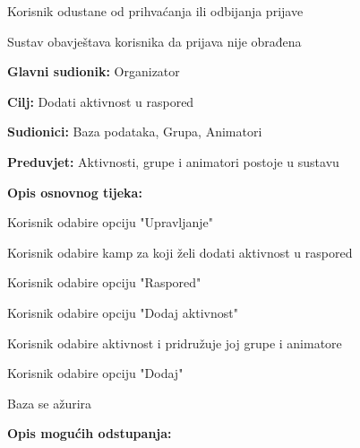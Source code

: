 \begin{packed_item}
\begin{packed_item}
\begin{packed_item}
							\item[5.a] Korisnik odustane od prihvaćanja ili odbijanja prijave
							\item[] \begin{packed_enum}
								
								\item Sustav obavještava korisnika da prijava nije obrađena
								
							\end{packed_enum}												
						\end{packed_item}
					\end{packed_item}
				
					\noindent {}
					\begin{packed_item}
						
						\item \textbf{Glavni sudionik: } Organizator
						\item  \textbf{Cilj:} Dodati aktivnost u raspored
						\item  \textbf{Sudionici:} Baza podataka, Grupa, Animatori
						\item  \textbf{Preduvjet:} Aktivnosti, grupe i animatori postoje u sustavu
						\item  \textbf{Opis osnovnog tijeka:}
						
						\item[] \begin{packed_enum}
							
							\item Korisnik odabire opciju "Upravljanje"
							\item Korisnik odabire kamp za koji želi dodati aktivnost u raspored
							\item Korisnik odabire opciju "Raspored"
							\item Korisnik odabire opciju "Dodaj aktivnost"
							\item Korisnik odabire aktivnost i pridružuje joj grupe i animatore
							\item Korisnik odabire opciju "Dodaj"
							\item Baza se ažurira
						\end{packed_enum}
						
						\item  \textbf{Opis mogućih odstupanja:}
						
						\item[] \begin{packed_item}
							

\end{packed_item}
\end{packed_item}
\end{packed_item}
